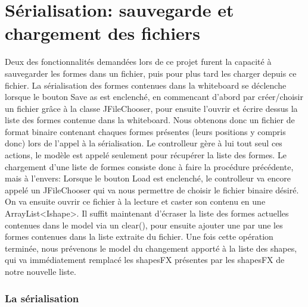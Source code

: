 \chapter{Sérialisation: sauvegarde et chargement des fichiers}


Deux des fonctionnalités demandées lors de ce projet furent la capacité à
sauvegarder les formes dans un fichier, puis pour plus tard les charger
depuis ce fichier.\newline
La sérialisation des formes contenues dans la whiteboard se déclenche lorsque
le bouton Save as est enclenché, en
commencant d'abord par créer/choisir un fichier grâce à la classe JFileChooser,
pour ensuite l'ouvrir et écrire dessus la liste des formes contenue dans la
whiteboard. Nous obtenons donc un fichier de format binaire contenant chaques
formes présentes (leurs positions y compris donc) lors de l'appel à la
sérialisation. Le controlleur gère à lui tout seul ces actions, le modèle est
appelé seulement pour récupérer la liste des formes.\newline
Le chargement d'une liste de formes consiste donc à faire la procédure
précédente, mais à l'envers: Lorsque le bouton Load est enclenché, le
controlleur va encore appelé un JFileChooser qui va nous permettre de choisir
le fichier binaire désiré. On va ensuite ouvrir ce fichier à la lecture et
caster son contenu en une ArrayList<Ishape>. Il suffit maintenant d'écraser la
liste des formes actuelles contenues dans le model via un clear(), pour
ensuite ajouter une par une les formes contenues dans la liste extraite du
fichier. Une fois cette opération terminée, nous prévenons le model du
changement apporté à la liste des shapes, qui va immédiatement remplacé les
shapesFX présentes par les shapesFX de notre nouvelle liste.\newline
\subsection{La sérialisation}

